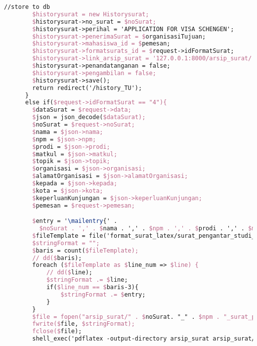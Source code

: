 \begin{lstlisting}[language=tex,basicstyle=\tiny,caption=HistorysuratController.php]
        //store to db
        $historysurat = new Historysurat;
        $historysurat->no_surat = $noSurat;
        $historysurat->perihal = 'APPLICATION FOR VISA SCHENGEN';
        $historysurat->penerimaSurat = $organisasiTujuan;
        $historysurat->mahasiswa_id = $pemesan;
        $historysurat->formatsurats_id = $request->idFormatSurat;
        $historysurat->link_arsip_surat = '127.0.0.1:8000/arsip_surat/' . $noSurat. '_' . $npm . '_surat_pengantar_pembuatan_visa.pdf';
        $historysurat->penandatanganan = false;
        $historysurat->pengambilan = false;
        $historysurat->save();
        return redirect('/history_TU');
      }
      else if($request->idFormatSurat == "4"){
        $dataSurat = $request->data;
        $json = json_decode($dataSurat);
        $noSurat = $request->noSurat;
        $nama = $json->nama;
        $npm = $json->npm;
        $prodi = $json->prodi;
        $matkul = $json->matkul;
        $topik = $json->topik;
        $organisasi = $json->organisasi;
        $alamatOrganisasi = $json->alamatOrganisasi;
        $kepada = $json->kepada;
        $kota = $json->kota;
        $keperluanKunjungan = $json->keperluanKunjungan;
        $pemesan = $request->pemesan;

        $entry = '\mailentry{' .
          $noSurat . ',' . $nama . ',' . $npm . ',' . $prodi . ',' . $matkul . ',' . $topik . ',' . $organisasi . ',' . $alamatOrganisasi . ',' . $keperluanKunjungan . ',' .$kota . ',' . $kepada . ',' . '}';
        $fileTemplate = file('format_surat_latex/surat_pengantar_studi_lapangan_1orang.tex');
        $stringFormat = "";
        $baris = count($fileTemplate);
        // dd($baris);
        foreach ($fileTemplate as $line_num => $line) {
            // dd($line);
            $stringFormat .= $line;
            if($line_num == $baris-3){
                $stringFormat .= $entry;
            }
        }
        $file = fopen("arsip_surat/" . $noSurat. "_" . $npm . "_surat_pengantar_studi_lapangan_1orang.tex", "w");
        fwrite($file, $stringFormat);
        fclose($file);
        shell_exec('pdflatex -output-directory arsip_surat arsip_surat/' . $noSurat . '_' . $npm . '_surat_pengantar_studi_lapangan_1orang.tex');


\end{lstlisting}
